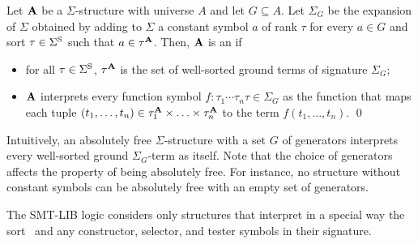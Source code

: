 \begin{definition}
Let $\mathbf{A}$ be a $\Sigma$-structure with universe $A$ and 
let $G \subseteq A$.
Let $\Sigma_G$ be the expansion of $\Sigma$ obtained by adding to $\Sigma$
a constant symbol $a$ of rank $\tau$
for every $a \in G$ and sort $\tau \in \Sigma^\mathrm{S}$ 
such that $a \in \tau^{\mathbf{A}}$.
Then, $\mathbf{A}$ is an 
if 
\begin{itemize}
\item
for all $\tau \in \Sigma^\mathrm{S}$, $\tau^{\mathbf{A}}$ is the set 
of well-sorted ground terms of signature $\Sigma_G$;

\item
$\mathbf{A}$ interprets every function symbol 
$f{:}\tau_1 \cdots \tau_n \tau \in \Sigma_G$ as the function that maps each tuple 
$(t_1,\ldots,t_n) \in \tau_1^{\mathbf{A}} \times \ldots \times \tau_n^{\mathbf{A}}$ 
to the term $f(t_1,\ldots,t_n)$.
\qed
\end{itemize}
\end{definition}

Intuitively, an absolutely free $\Sigma$-structure with a set $G$ of generators
interprets every well-sorted ground $\Sigma_G$-term as itself.
Note that the choice of generators affects the property of being absolutely free.
For instance, no structure without constant symbols can be absolutely free 
with an empty set of generators.
\medskip

The SMT-LIB logic considers only structures that interpret in a special way 
the sort \bool\ and any constructor, selector, and tester symbols in their signature.

